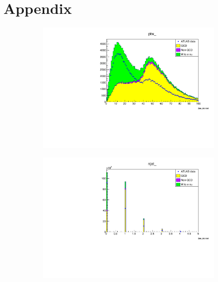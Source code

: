 \section{Appendix}
\label{sec:appendix}

\begin{figure}
    \begin{subfigure}{0.5\textwidth}
        \includegraphics[width=\textwidth]{../W_mass/ptw_100_0_100_qcd1.pdf}
    \end{subfigure}
    \begin{subfigure}{0.5\textwidth}
        \includegraphics[width=\textwidth]{../W_mass/njet_100_0_5_qcd1.pdf}
    \end{subfigure}
    \begin{subfigure}{0.5\textwidth}

\end{subfigure}
\end{figure}
